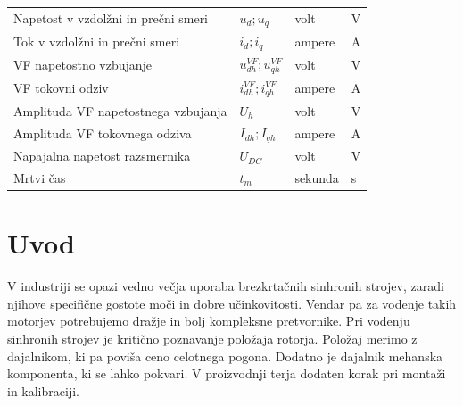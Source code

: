 \documentclass[a4paper,twoside,openright,12pt,slovene]{book}
\begin{document}
\begin{center}
\begin{tabular}{*{4}{l}}
        Napetost v vzdolžni in prečni smeri                        & $u_{d}; u_{q}$                         & volt                 & V                      \\
        Tok v vzdolžni in prečni smeri                             & $i_{d}; i_{q}$                         & ampere               & A                      \\
        VF napetostno vzbujanje                                    & $u^{VF}_{dh}; u^{VF}_{qh}$             & volt                 & V                      \\
        VF tokovni odziv                                           & $i^{VF}_{dh}; i^{VF}_{qh}$             & ampere               & A                      \\
        Amplituda VF napetostnega vzbujanja                        & $U_h$                                  & volt                 & V                      \\
        Amplituda VF tokovnega odziva                              & $I_{dh}; I_{qh}$                       & ampere               & A                      \\
        Napajalna napetost razsmernika                             & $U_{DC}$                               & volt                 & V                      \\
        Mrtvi čas                                                  & $t_m$                                  & sekunda              & s                      \\
    \end{tabular}
\end{center}

\mainmatter

\chapter{Uvod} \label{uvod}

V industriji se opazi vedno večja uporaba brezkrtačnih sinhronih strojev, zaradi njihove specifične gostote moči in dobre učinkovitosti. Vendar pa za vodenje takih motorjev potrebujemo dražje in bolj
kompleksne pretvornike. Pri vodenju sinhronih strojev je kritično poznavanje položaja rotorja. Položaj merimo z dajalnikom, ki pa poviša ceno celotnega pogona. Dodatno je dajalnik mehanska komponenta,
ki se lahko pokvari. V proizvodnji terja dodaten korak pri montaži in kalibraciji.
\end{document}
